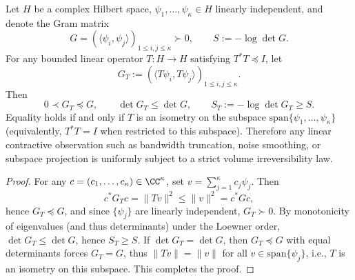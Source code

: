 %

\begin{proposition}\label{prop:xi-gram-det-entropy-monotone-under-contraction}
Let \(H\) be a complex Hilbert space, \(\psi_1,\dots,\psi_\kappa\in H\) linearly independent, and denote the Gram matrix
\[
G=(\langle\psi_i,\psi_j\rangle)_{1\le i,j\le\kappa}\succ0,
\qquad
S:=-\log\det G.
\]
For any bounded linear operator \(T:H\to H\) satisfying \(T^\ast T\preceq I\), let
\[
G_T:=(\langle T\psi_i,T\psi_j\rangle)_{1\le i,j\le\kappa}.
\]
Then
\[
\boxed{\;
0\prec G_T\preceq G,\qquad
\det G_T\le \det G,\qquad
S_T:=-\log\det G_T\ge S.\;}
\]
Equality holds if and only if \(T\) is an isometry on the subspace \(\mathrm{span}\{\psi_1,\dots,\psi_\kappa\}\) (equivalently, \(T^\ast T=I\) when restricted to this subspace).
Therefore any linear contractive observation such as bandwidth truncation, noise smoothing, or subspace projection is uniformly subject to a strict volume irreversibility law.
\end{proposition}
\begin{proof}
For any \(c=(c_1,\dots,c_\kappa)\in\CC^\kappa\), set \(v=\sum_{j=1}^\kappa c_j\psi_j\).
Then
\[
c^\ast G_T c=\|Tv\|^2\le \|v\|^2=c^\ast G c,
\]
hence \(G_T\preceq G\), and since \(\{\psi_j\}\) are linearly independent, \(G_T\succ0\).
By monotonicity of eigenvalues (and thus determinants) under the Loewner order, \(\det G_T\le \det G\), hence \(S_T\ge S\).
If \(\det G_T=\det G\), then \(G_T\preceq G\) with equal determinants forces \(G_T=G\), thus \(\|Tv\|=\|v\|\) for all \(v\in\mathrm{span}\{\psi_j\}\), i.e., \(T\) is an isometry on this subspace. This completes the proof.
\end{proof}

